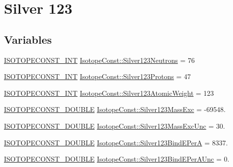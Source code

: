 \hypertarget{group___isotope_const-_silver-_ag123}{}\section{Silver 123}
\label{group___isotope_const-_silver-_ag123}
\subsection*{Variables}
\begin{DoxyCompactItemize}
\item 
\mbox{\hyperlink{group___isotope_const-_macros_ga5f18360b3e99483a35c32d789e62621c}{I\+S\+O\+T\+O\+P\+E\+C\+O\+N\+S\+T\+\_\+\+I\+NT}} \mbox{\hyperlink{group___isotope_const-_silver-_ag123_ga5d55f7701ea998bc542a629f300220dc}{Isotope\+Const\+::\+Silver123\+Neutrons}} = 76
\item 
\mbox{\hyperlink{group___isotope_const-_macros_ga5f18360b3e99483a35c32d789e62621c}{I\+S\+O\+T\+O\+P\+E\+C\+O\+N\+S\+T\+\_\+\+I\+NT}} \mbox{\hyperlink{group___isotope_const-_silver-_ag123_gad360075ad24dfc3470a0a2007d33baf8}{Isotope\+Const\+::\+Silver123\+Protons}} = 47
\item 
\mbox{\hyperlink{group___isotope_const-_macros_ga5f18360b3e99483a35c32d789e62621c}{I\+S\+O\+T\+O\+P\+E\+C\+O\+N\+S\+T\+\_\+\+I\+NT}} \mbox{\hyperlink{group___isotope_const-_silver-_ag123_ga46f9fad19ca9ca3470ff608cbd2fea33}{Isotope\+Const\+::\+Silver123\+Atomic\+Weight}} = 123
\item 
\mbox{\hyperlink{group___isotope_const-_macros_ga8f45a7272ce02c0b4c65c44636ed719a}{I\+S\+O\+T\+O\+P\+E\+C\+O\+N\+S\+T\+\_\+\+D\+O\+U\+B\+LE}} \mbox{\hyperlink{group___isotope_const-_silver-_ag123_ga37fa0012b4b3be8349c1ad164cff8a43}{Isotope\+Const\+::\+Silver123\+Mass\+Exc}} = -\/69548.
\item 
\mbox{\hyperlink{group___isotope_const-_macros_ga8f45a7272ce02c0b4c65c44636ed719a}{I\+S\+O\+T\+O\+P\+E\+C\+O\+N\+S\+T\+\_\+\+D\+O\+U\+B\+LE}} \mbox{\hyperlink{group___isotope_const-_silver-_ag123_ga58e57643100d1f925b7115f9629bda14}{Isotope\+Const\+::\+Silver123\+Mass\+Exc\+Unc}} = 30.
\item 
\mbox{\hyperlink{group___isotope_const-_macros_ga8f45a7272ce02c0b4c65c44636ed719a}{I\+S\+O\+T\+O\+P\+E\+C\+O\+N\+S\+T\+\_\+\+D\+O\+U\+B\+LE}} \mbox{\hyperlink{group___isotope_const-_silver-_ag123_ga9c28f8e4efda66412a935577a3b23743}{Isotope\+Const\+::\+Silver123\+Bind\+E\+PerA}} = 8337.
\item 
\mbox{\hyperlink{group___isotope_const-_macros_ga8f45a7272ce02c0b4c65c44636ed719a}{I\+S\+O\+T\+O\+P\+E\+C\+O\+N\+S\+T\+\_\+\+D\+O\+U\+B\+LE}} \mbox{\hyperlink{group___isotope_const-_silver-_ag123_ga7b58f250d6ff7ea5077028c3b8f5371e}{Isotope\+Const\+::\+Silver123\+Bind\+E\+Per\+A\+Unc}} = 0.

\end{DoxyCompactItemize}
